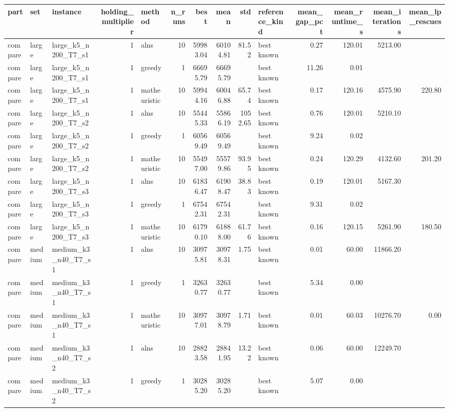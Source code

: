 \begin{tabular}{lllrlrrrrlrrrr}
\toprule
part & set & instance & holding\_multiplier & method & n\_runs & best & mean & std & reference\_kind & mean\_gap\_pct & mean\_runtime\_s & mean\_iterations & mean\_lp\_rescues \\
\midrule
compare & large & large\_k5\_n200\_T7\_s1 & 1 & alns & 10 & 59983.04 & 60104.81 & 81.52 & best known & 0.27 & 120.01 & 5213.00 &  \\
compare & large & large\_k5\_n200\_T7\_s1 & 1 & greedy & 1 & 66695.79 & 66695.79 &  & best known & 11.26 & 0.01 &  &  \\
compare & large & large\_k5\_n200\_T7\_s1 & 1 & matheuristic & 10 & 59944.16 & 60046.88 & 65.74 & best known & 0.17 & 120.16 & 4575.90 & 220.80 \\
compare & large & large\_k5\_n200\_T7\_s2 & 1 & alns & 10 & 55445.33 & 55866.19 & 1052.65 & best known & 0.76 & 120.01 & 5210.10 &  \\
compare & large & large\_k5\_n200\_T7\_s2 & 1 & greedy & 1 & 60569.49 & 60569.49 &  & best known & 9.24 & 0.02 &  &  \\
compare & large & large\_k5\_n200\_T7\_s2 & 1 & matheuristic & 10 & 55497.00 & 55579.86 & 93.95 & best known & 0.24 & 120.29 & 4132.60 & 201.20 \\
compare & large & large\_k5\_n200\_T7\_s3 & 1 & alns & 10 & 61836.47 & 61908.47 & 38.83 & best known & 0.19 & 120.01 & 5167.30 &  \\
compare & large & large\_k5\_n200\_T7\_s3 & 1 & greedy & 1 & 67542.31 & 67542.31 &  & best known & 9.31 & 0.02 &  &  \\
compare & large & large\_k5\_n200\_T7\_s3 & 1 & matheuristic & 10 & 61790.10 & 61888.00 & 61.76 & best known & 0.16 & 120.15 & 5261.90 & 180.50 \\
compare & medium & medium\_k3\_n40\_T7\_s1 & 1 & alns & 10 & 30975.81 & 30978.31 & 1.75 & best known & 0.01 & 60.00 & 11866.20 &  \\
compare & medium & medium\_k3\_n40\_T7\_s1 & 1 & greedy & 1 & 32630.77 & 32630.77 &  & best known & 5.34 & 0.00 &  &  \\
compare & medium & medium\_k3\_n40\_T7\_s1 & 1 & matheuristic & 10 & 30977.01 & 30978.79 & 1.71 & best known & 0.01 & 60.03 & 10276.70 & 0.00 \\
compare & medium & medium\_k3\_n40\_T7\_s2 & 1 & alns & 10 & 28823.58 & 28841.95 & 13.22 & best known & 0.06 & 60.00 & 12249.70 &  \\
compare & medium & medium\_k3\_n40\_T7\_s2 & 1 & greedy & 1 & 30285.20 & 30285.20 &  & best known & 5.07 & 0.00 &  &  \\

\end{tabular}
